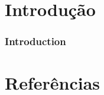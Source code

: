 \documentclass[10pt]{beamer}
\theoremstyle{plain}
\theoremstyle{definition}
\begin{document}
	\begin{frame}
		\tableofcontents 
	\end{frame}
	
	\section{Introdução}
	
	\begin{frame}
		\frametitle{\normalsize Introduction } 
		{
			
		}	
	\end{frame}
	
	\section{Referências}
	\begin{frame}		
		
		{\footnotesize
		
		}
	\end{frame}
	
\end{document}
